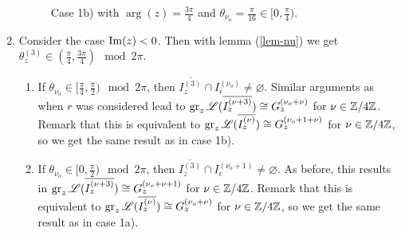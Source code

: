 \begin{enumerate}
\begin{figure}[h!]
\begin{minipage}{0.48\textwidth}
\begin{tikzpicture}
\end{tikzpicture}
\captionsetup{font=small}
\caption{Case 1b) with $\arg(z)=\frac{3\pi}{4}$ and $\theta_{\nu_o} = \frac{\pi}{16}\in [0, \frac{\pi}{4})$.}
\end{minipage}
\end{figure}


    \item Consider the case $\im(z) < 0$. Then with lemma (\ref{lem-nu}) we get $\theta_z^{(3)} \in \left(\frac{\pi}{4}, \frac{3\pi}{4}\right) \mod 2\pi$.
    \begin{enumerate}
            \item If $\theta_{\nu_o} \in [\frac{\pi}{4},\frac{\pi}{2}) \mod 2\pi$, then $\overline{I_z^{(3)}} \cap I^{(\nu_o)}_\epsilon \neq \varnothing$. Similar arguments as when $r$ was considered lead to $\gr_z\Lo(\overline{I_z^{(\nu+3)}}) \cong G^{(\nu_o +\nu)}_z$ for $\nu \in \Z/4\Z$. Remark that this is equivalent to $\gr_z\Lo(\overline{I_z^{(\nu)}}) \cong G^{(\nu_o+1 +\nu)}_z$ for $\nu \in \Z/4\Z$, so we get the same result as in case 1b).
            \item If $\theta_{\nu_o} \in [0,\frac{\pi}{2}) \mod 2\pi$, then $\overline{I_z^{(3)}} \cap I^{(\nu_o+1)}_\epsilon \neq \varnothing$. As before, this results in $\gr_z\Lo(\overline{I_z^{(\nu+3)}}) \cong G^{(\nu_o+ \nu+1)}_z$ for $\nu \in \Z/4\Z$. Remark that this is equivalent to $\gr_z\Lo(\overline{I_z^{(\nu)}}) \cong G^{(\nu_o +\nu)}_z$ for $\nu \in \Z/4\Z$, so we get the same result as in case 1a).
        \end{enumerate}

\begin{figure}[h!]
\begin{minipage}{0.48\textwidth}
\centering
{}
\end{minipage}
\end{figure}
\end{enumerate}
